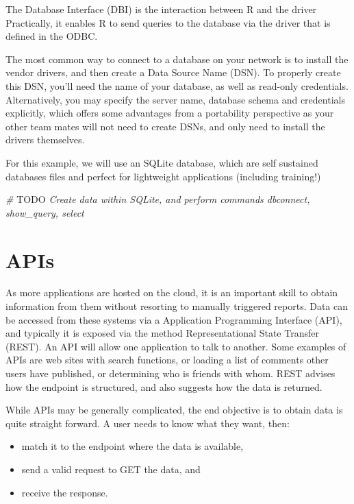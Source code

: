 \documentclass[
]{book}
\newenvironment{Shaded}{\begin{snugshade}}{\end{snugshade}}
\newcommand{\AlertTok}[1]{\textcolor[rgb]{0.94,0.16,0.16}{#1}}
\newcommand{\CommentTok}[1]{\textcolor[rgb]{0.56,0.35,0.01}{\textit{#1}}}
\providecommand{\tightlist}{%
  \setlength{\itemsep}{0pt}\setlength{\parskip}{0pt}}
\begin{document}
The Database Interface (DBI) is the interaction between R and the driver Practically, it enables R to send queries to the database via the driver that is defined in the ODBC.

The most common way to connect to a database on your network is to install the vendor drivers, and then create a Data Source Name (DSN). To properly create this DSN, you'll need the name of your database, as well as read-only credentials. Alternatively, you may specify the server name, database schema and credentials explicitly, which offers some advantages from a portability perspective as your other team mates will not need to create DSNs, and only need to install the drivers themselves.

For this example, we will use an SQLite database, which are self sustained databases files and perfect for lightweight applications (including training!)

\begin{Shaded}
\begin{Highlighting}[]
\CommentTok{# }\AlertTok{TODO}\CommentTok{ Create data within SQLite, and perform commands dbconnect, show_query, select}
\end{Highlighting}
\end{Shaded}

\hypertarget{apis}{%
\section{APIs}\label{apis}}

As more applications are hosted on the cloud, it is an important skill to obtain information from them without resorting to manually triggered reports. Data can be accessed from these systems via a Application Programming Interface (API), and typically it is exposed via the method Representational State Transfer (REST). An API will allow one application to talk to another. Some examples of APIs are web sites with search functions, or loading a list of comments other users have published, or determining who is friends with whom. REST advises how the endpoint is structured, and also suggests how the data is returned.

While APIs may be generally complicated, the end objective is to obtain data is quite straight forward. A user needs to know what they want, then:

\begin{itemize}
\tightlist
\item
  match it to the endpoint where the data is available,
\item
  send a valid request to GET the data, and
\item
  receive the response.
\end{itemize}
\end{document}
